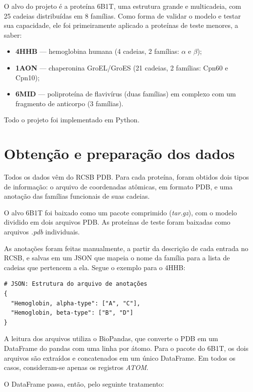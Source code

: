 \documentclass[12pt]{article}
\begin{document}
	O alvo do projeto é a proteína 6B1T, uma estrutura grande e multicadeia, com 25 cadeias distribuídas em 8 famílias. Como forma de validar o modelo e testar sua capacidade, ele foi primeiramente aplicado a proteínas de teste menores, a saber:

	\begin{itemize}
		\item \textbf{4HHB} --- hemoglobina humana (4 cadeias, 2 famílias: $\alpha$ e $\beta$);
		\item \textbf{1AON} --- chaperonina GroEL/GroES (21 cadeias, 2 famílias: Cpn60 e Cpn10);
		\item \textbf{6MID} --- poliproteína de flavivírus (duas famílias) em complexo com um fragmento de anticorpo (3 famílias).
	\end{itemize}

	Todo o projeto foi implementado em Python.

	\section{Obtenção e preparação dos dados}
	\label{sec_dados}

	Todos os dados vêm do RCSB PDB. Para cada proteína, foram obtidos dois tipos de informação: o arquivo de coordenadas atômicas, em formato PDB, e uma anotação das famílias funcionais de suas cadeias.

	O alvo 6B1T foi baixado como um pacote comprimido (\textit{tar.gz}), com o modelo dividido em dois arquivos PDB. As proteínas de teste foram baixadas como arquivos \textit{.pdb} individuais.

	As anotações foram feitas manualmente, a partir da descrição de cada entrada no RCSB, e salvas em um JSON que mapeia o nome da família para a lista de cadeias que pertencem a ela. Segue o exemplo para o 4HHB:

	\begin{verbatim}
# JSON: Estrutura do arquivo de anotações
{
  "Hemoglobin, alpha-type": ["A", "C"],
  "Hemoglobin, beta-type": ["B", "D"]
}
	\end{verbatim}

	A leitura dos arquivos utiliza o BioPandas, que converte o PDB em um DataFrame do pandas com uma linha por átomo. Para o pacote do 6B1T, os dois arquivos são extraídos e concatenados em um único DataFrame. Em todos os casos, consideram-se apenas os registros \textit{ATOM}.

	O DataFrame passa, então, pelo seguinte tratamento:
\end{document}

